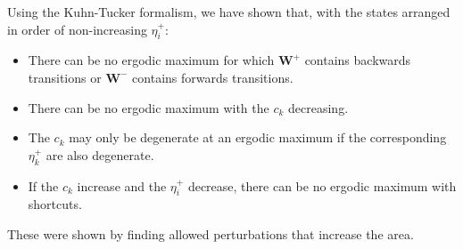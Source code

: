 \documentclass[12pt]{article}
\newcommand{\W}{\mathbf{W}}
\begin{document}
Using the Kuhn-Tucker formalism, we have shown that,
with the states arranged in order of non-increasing $\eta^+_i$:
%
\begin{itemize}
  \item There can be no ergodic maximum for which $\W^+$ contains backwards transitions or $\W^-$ contains forwards transitions.
  \item There can be no ergodic maximum with the $c_k$ decreasing.
  \item The $c_k$ may only be degenerate at an ergodic maximum if the corresponding $\eta^+_k$ are also degenerate.
  \item If the $c_k$ increase and the $\eta^+_i$ decrease, there can be no ergodic maximum with shortcuts.
\end{itemize}
%
These were shown by finding allowed perturbations that increase the area.

%
\end{document}
